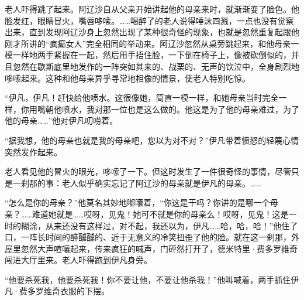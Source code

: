 \par 老人吓得跳了起来。阿辽沙自从父亲开始讲起他的母亲来时，就渐渐变了脸色。他脸发红，眼睛冒火，嘴唇哆嗦。……喝醉了的老人说得唾沫四溅，一点也没有觉察出来，直到发现阿辽沙身上忽然出现了某种很奇怪的现象，也就是忽然重复起跟他刚才所讲的“疯癫女人”完全相同的举动来。阿辽沙忽然从桌旁跳起来，和他母亲一模一样地两手紧握在一起，然后用手捂住脸，一下倒在椅子上，像被砍倒似的，并且忽然在歇斯底里地发作的一阵突如其来的、战栗的、无声的饮泣中，全身剧烈地哆嗦起来。这种和他母亲异乎寻常地相像的情景，使老人特别吃惊。
\par “伊凡，伊凡！赶快给他喷水。这很像她，简直一模一样，和她母亲当时完全一样，你用嘴朝他喷水，我对那一位也是这么做的。他这是为了他的母亲难过，为了他的母亲……”他对伊凡叨唠着。
\par “据我想，他的母亲也就是我的母亲吧，您以为对不对？”伊凡带着愤怒的轻蔑心情突然发作起来。
\par 老人看见他的冒火的眼光，哆嗦了一下。但这时发生了一件很奇怪的事情，尽管只是一刹那的事：老人似乎确实忘记了阿辽沙的母亲就是伊凡的母亲。……
\par “怎么是你的母亲？”他莫名其妙地嘟囔着，“你这是干吗？你讲的是哪一个母亲？……难道她就是……哎呀，见鬼！她可不就是你的母亲么！哎呀，见鬼！这是一时的糊涂，从来还没有这样过，对不起，我还以为，伊凡……哈，哈，哈！”他住了口，一阵长时间的醉醺醺的、近于无意义的冷笑扭歪了他的脸。就在这一刹那，外屋里忽然大声喧嚷起来，传来疯狂的喊声，门砰然打开了，德米特里·费多罗维奇闯进大厅里来。老人吓得跑到伊凡身旁。
\par “他要杀死我，他要杀死我！你不要让他，不要让他杀我！”他叫喊着，两手抓住伊凡·费多罗维奇衣服的下摆。
